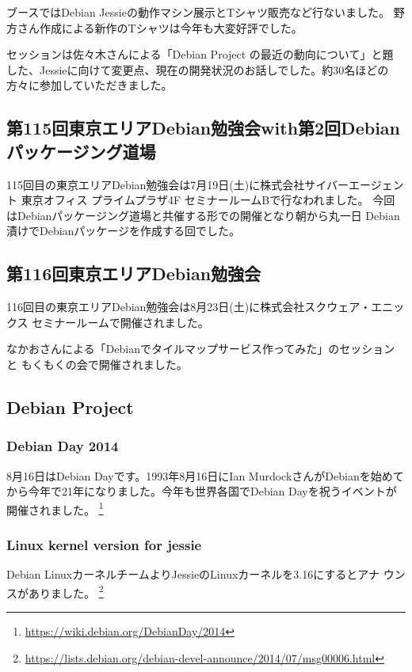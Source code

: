 \documentclass[mingoth,a4paper]{jsarticle}
\begin{document}
ブースではDebian Jessieの動作マシン展示とTシャツ販売など行ないました。
野方さん作成による新作のTシャツは今年も大変好評でした。

セッションは佐々木さんによる「Debian Project の最近の動向について」と題
した、Jessieに向けて変更点、現在の開発状況のお話しでした。約30名ほどの
方々に参加していただきました。

\subsection{第115回東京エリアDebian勉強会with第2回Debianパッケージング道場}

115回目の東京エリアDebian勉強会は7月19日(土)に株式会社サイバーエージェント
東京オフィス プライムプラザ4F セミナールームBで行なわれました。
今回はDebianパッケージング道場と共催する形での開催となり朝から丸一日
Debian漬けでDebianパッケージを作成する回でした。

\subsection{第116回東京エリアDebian勉強会}

116回目の東京エリアDebian勉強会は8月23日(土)に株式会社スクウェア・エニッ
クス セミナールームで開催されました。

なかおさんによる「Debianでタイルマップサービス作ってみた」のセッションと
もくもくの会で開催されました。

\subsection{Debian Project}

\subsubsection{Debian Day 2014}

8月16日はDebian Dayです。1993年8月16日にIan MurdockさんがDebianを始めて
から今年で21年になりました。今年も世界各国でDebian Dayを祝うイベントが
開催されました。
\footnote{\url{https://wiki.debian.org/DebianDay/2014}}


\subsubsection{Linux kernel version for jessie}

Debian LinuxカーネルチームよりJessieのLinuxカーネルを3.16にするとアナ
ウンスがありました。
\footnote{\url{https://lists.debian.org/debian-devel-announce/2014/07/msg00006.html}}
\end{document}
